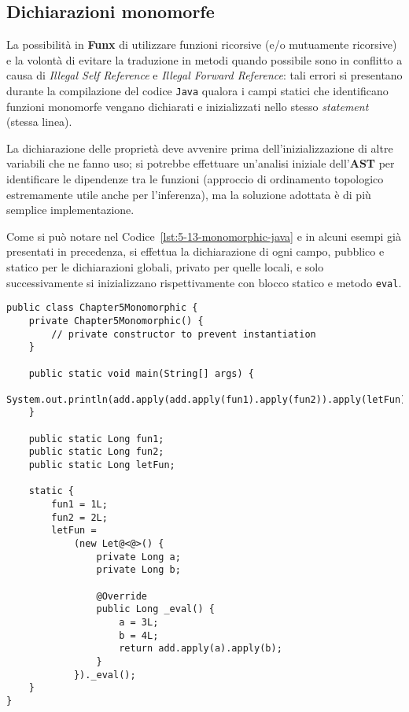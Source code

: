 \subsection{Dichiarazioni monomorfe}
\label{sec:5-13-monomorphic-declarations}

La possibilità in \textbf{Funx} di utilizzare funzioni ricorsive (e/o mutuamente ricorsive)
e la volontà di evitare la traduzione in metodi quando possibile sono in conflitto
a causa di \textit{Illegal Self Reference} e \textit{Illegal Forward Reference}:
tali errori si presentano durante la compilazione del codice \texttt{Java}
qualora i campi statici che identificano funzioni monomorfe vengano dichiarati e inizializzati
nello stesso \textit{statement} (stessa linea).


La dichiarazione delle proprietà deve avvenire prima dell'inizializzazione di altre variabili che ne fanno uso;
si potrebbe effettuare un'analisi iniziale dell'\textbf{AST} per identificare le dipendenze tra le funzioni
(approccio di ordinamento topologico estremamente utile anche per l'inferenza), ma la soluzione adottata
è di più semplice implementazione.


Come si può notare nel Codice~\ref{lst:5-13-monomorphic-java} e in alcuni esempi già presentati in precedenza,
si effettua la dichiarazione di ogni campo, pubblico e statico per le dichiarazioni globali, privato per quelle locali,
e solo successivamente si inizializzano rispettivamente con blocco statico e metodo \texttt{eval}.

\vspace{4mm}
\begin{lstlisting}[caption={Esempio di traduzione per funzioni monomorfe}, style=javaCode, label={lst:5-13-monomorphic-java}]
public class Chapter5Monomorphic {
    private Chapter5Monomorphic() {
        // private constructor to prevent instantiation
    }
    
    public static void main(String[] args) {
        System.out.println(add.apply(add.apply(fun1).apply(fun2)).apply(letFun));
    }
    
    public static Long fun1;    
    public static Long fun2;    
    public static Long letFun;
    
    static {
        fun1 = 1L;    
        fun2 = 2L;    
        letFun =
            (new Let@<@>() {
                private Long a;    
                private Long b;
    
                @Override
                public Long _eval() {
                    a = 3L;
                    b = 4L;
                    return add.apply(a).apply(b);
                }
            })._eval();
    }
}
\end{lstlisting}

